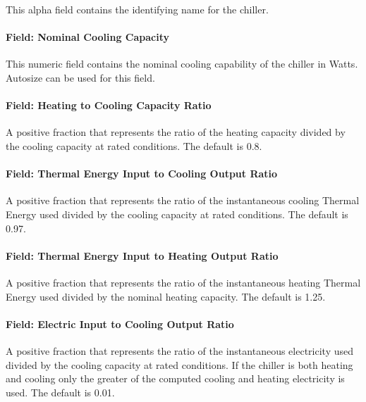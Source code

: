 This alpha field contains the identifying name for the chiller.

\paragraph{Field: Nominal Cooling Capacity}\label{field-nominal-cooling-capacity-1}

This numeric field contains the nominal cooling capability of the chiller in Watts. Autosize can be used for this field.

\paragraph{Field: Heating to Cooling Capacity Ratio}\label{field-heating-to-cooling-capacity-ratio-1}

A positive fraction that represents the ratio of the heating capacity divided by the cooling capacity at rated conditions. The default is 0.8.

\paragraph{Field: Thermal Energy Input to Cooling Output Ratio}\label{field-thermal-energy-input-to-cooling-output-ratio}

A positive fraction that represents the ratio of the instantaneous cooling Thermal Energy used divided by the cooling capacity at rated conditions. The default is 0.97.

\paragraph{Field: Thermal Energy Input to Heating Output Ratio}\label{field-thermal-energy-input-to-heating-output-ratio}

A positive fraction that represents the ratio of the instantaneous heating Thermal Energy used divided by the nominal heating capacity. The default is 1.25.

\paragraph{Field: Electric Input to Cooling Output Ratio}\label{field-electric-input-to-cooling-output-ratio-1}

A positive fraction that represents the ratio of the instantaneous electricity used divided by the cooling capacity at rated conditions. If the chiller is both heating and cooling only the greater of the computed cooling and heating electricity is used. The default is 0.01.

